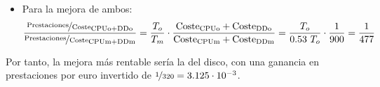 \begin{ejercicio}
\begin{enumerate}
\begin{itemize}
        \item Para la mejora de ambos:
        \begin{equation*}
            \dfrac{\nicefrac{\text{Prestaciones}}{\text{Coste}}_{\text{CPUo}+\text{DDo}}}{\nicefrac{\text{Prestaciones}}{\text{Coste}}_{\text{CPUm}+\text{DDm}}} = \dfrac{T_o}{T_m}\cdot \dfrac{\text{Coste}_{\text{CPUo}}+\text{Coste}_{\text{DDo}}}{\text{Coste}_{\text{CPUm}}+\text{Coste}_{\text{DDm}}}
            = \dfrac{T_o}{0.53\ T_o}\cdot \dfrac{1}{900} = \dfrac{1}{477}
        \end{equation*}
    \end{itemize}

    Por tanto, la mejora más rentable sería la del disco, con una ganancia en prestaciones por euro invertido de $\nicefrac{1}{320}=3.125\cdot 10^{-3}$.
\end{enumerate}
\end{ejercicio}
\begin{comment}
SOLUCIÓN:
\begin{enumerate}
    \item 1,37.
    \item 1,25.
    \item 1,89.
    \item El nuevo sub-sistema de discos, con una ganancia en
    \item velocidad de 1,25.
\end{enumerate}
\end{comment}

